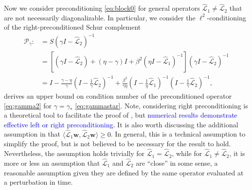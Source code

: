 \documentclass[review]{siamart}
\newcommand{\tcb}{\textcolor{blue}}
\begin{document}
Now we consider preconditioning \eqref{eq:block0} for general operators 
$\widehat{\mathcal{L}}_1\neq\widehat{\mathcal{L}}_2$ that are not necessarily diagonalizable.
In particular, we consider the $\ell^2$-conditioning of the right-preconditioned
Schur complement
%
\begin{align}\nonumber
\mathcal{P}_\gamma :&=
S(\gamma I- \widehat{\mathcal{L}}_2)^{-1} \\
& = \left[ (\gamma I - \widehat{\mathcal{L}}_2) + (\eta-\gamma)I +
	\beta^2 (\eta I - \widehat{\mathcal{L}}_1)^{-1}\right]
	(\gamma I - \widehat{\mathcal{L}}_2)^{-1} \nonumber\\
& = I - \frac{\gamma - \eta}{\gamma} ( I- \tfrac{1}{\gamma}\widehat{\mathcal{L}}_2)^{-1} + 
	\frac{\beta^2}{\gamma\eta}( I- \tfrac{1}{\eta}\widehat{\mathcal{L}}_1)^{-1}
	( I- \tfrac{1}{\gamma}\widehat{\mathcal{L}}_2)^{-1},\label{eq:gamma2}
\end{align}
%
 derives an upper bound on condition number of the preconditioned
operator \eqref{eq:gamma2} for $\gamma = \gamma_*$ \eqref{eq:gammastar}.
Note, considering right preconditioning is a theoretical tool to facilitate
the proof of , but \tcb{numerical results demonstrate effective
left or right preconditioning.} It is also worth discussing the additional
assumption in  that $\langle\widehat{\mathcal{L}}_1\mathbf{w},
\widehat{\mathcal{L}}_2\mathbf{w}\rangle\geq 0$. In general, this is a technical
assumption to simplify the proof, but is not believed to be necessary for the
result to hold. Nevertheless, the assumption holds trivially for
$\widehat{\mathcal{L}}_1=\widehat{\mathcal{L}}_2$, while for 
$\widehat{\mathcal{L}}_1 \neq \widehat{\mathcal{L}}_2$, it is more or less
an assumption that $\widehat{\mathcal{L}}_1$ and $\widehat{\mathcal{L}}_2$
are ``close'' in some sense, a reasonable assumption given they are
defined by the same operator evaluated at a perturbation in time.
\end{document}
